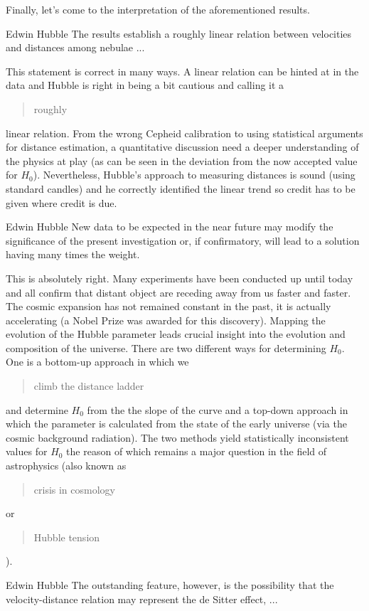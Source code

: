 Finally, let's come to the interpretation of the aforementioned results. 

\begin{shadequote}[r]{Edwin Hubble \autocite{Hubble1929}}
	The results establish a roughly linear relation between velocities and distances among nebulae ...
\end{shadequote}
This statement is correct in many ways. A linear relation can be hinted at in the data and Hubble is right in being a bit cautious and calling it a \blockquote{roughly} linear relation. From the wrong Cepheid calibration to using statistical arguments for distance estimation, a quantitative discussion need a deeper understanding of the physics at play (as can be seen in the deviation from the now accepted value for \( H_0 \)). Nevertheless, Hubble's approach to measuring distances is sound (using standard candles) and he correctly identified the linear trend so credit has to be given where credit is due. 


\begin{shadequote}[r]{Edwin Hubble \autocite{Hubble1929}}
	New data to be expected in the near future may modify the significance of the present investigation or, if confirmatory, will lead to a solution having many times the weight.
\end{shadequote}
This is absolutely right. Many experiments have been conducted up until today and all confirm that distant object are receding away from us faster and faster. The cosmic expansion has not remained constant in the past, it is actually accelerating (a Nobel Prize was awarded for this discovery). Mapping the evolution of the Hubble parameter leads crucial insight into the evolution and composition of the universe.  There are two different ways for determining \( H_0 \). One is a bottom-up approach in which we \blockquote{climb the distance ladder} and determine \( H_0 \) from the the slope of the curve and a top-down approach in which the parameter is calculated from the state of the early universe (via the cosmic background radiation). The two methods yield statistically inconsistent values for \( H_0 \) the reason of which remains a major question in the field of astrophysics (also known as \blockquote{crisis in cosmology} or \blockquote{Hubble tension}).

\begin{shadequote}[r]{Edwin Hubble \autocite{Hubble1929}}
	The outstanding feature, however, is the possibility that the velocity-distance relation may represent the de Sitter effect, ...
\end{shadequote}

